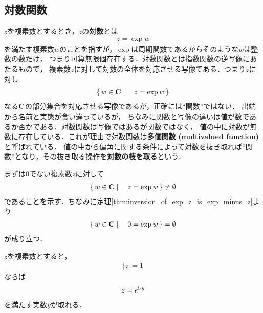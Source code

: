 \subsection{対数関数}
	
	$z$を複素数とするとき，$z$の{\bf 対数}とは
	\begin{align}
		z = \exp{w}
	\end{align}
	を満たす複素数$w$のことを指すが，$\exp$は周期関数であるからそのような$w$は整数の数だけ，
	つまり可算無限個存在する．対数関数とは指数関数の逆写像にあたるもので，
	複素数$z$に対して対数の全体を対応させる写像である．つまり$z$に対し
	\begin{align}
		\left\{\, w \in \mathbf{C} \mid \quad z = \exp{w}\, \right\}
	\end{align}
	なる$\mathbf{C}$の部分集合を対応させる写像であるが，正確には``関数''ではない．
	出端から名前と実態が食い違っているが，
	ちなみに関数と写像の違いは値が数であるか否かである．対数関数は写像ではあるが関数ではなく，
	値の中に対数が無数に存在している．これが理由で対数関数は{\bf 多価関数}
	{\bf (multivalued function)}と呼ばれている．
	値の中から偏角に関する条件によって対数を抜き取れば``関数''となり，その抜き取る操作を{\bf 対数の枝を取る}という．
	
	まずは$0$でない複素数$z$に対して
	\begin{align}
		\left\{\, w \in \mathbf{C} \mid \quad z = \exp{w}\, \right\} \neq \emptyset
	\end{align}
	であることを示す．ちなみに定理\ref{thm:inversion_of_exp_z_is_exp_minus_z}より
	\begin{align}
		\left\{\, w \in \mathbf{C} \mid \quad 0 = \exp{w}\, \right\} = \emptyset
	\end{align}
	が成り立つ．
	
	\begin{screen}
		\begin{thm}
		\label{thm:complex_number_with_absolute_value_1_is_exp_pure_imaginary}
			$z$を複素数とすると，
			\begin{align}
				|z| = 1
			\end{align}
			ならば
			\begin{align}
				z = e^{\mathbf{i} \cdot y}
			\end{align}
			を満たす実数$y$が取れる．
		\end{thm}
	\end{screen}
	

